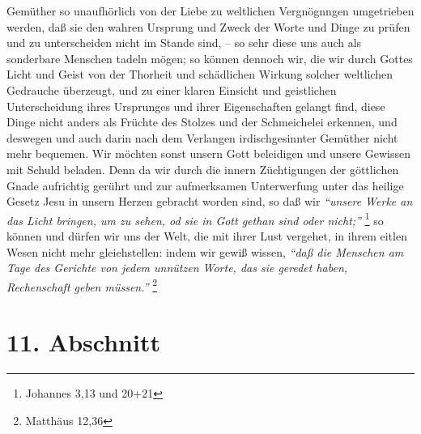 Gemüther so unaufhörlich von der Liebe zu weltlichen Vergnögnngen umgetrieben
werden, daß sie den wahren Ursprung und Zweck der Worte und Dinge zu prüfen und
zu unterscheiden nicht im Stande sind, -- so sehr diese uns auch als sonderbare
Menschen tadeln mögen; so können dennoch wir, die wir durch Gottes Licht und
Geist von der Thorheit und schädlichen Wirkung solcher weltlichen Gedrauche
überzeugt, und zu einer klaren Einsicht und geistlichen Unterscheidung ihres
Ursprunges und ihrer Eigenschaften gelangt find, diese Dinge nicht anders als
Früchte des Stolzes und der Schmeichelei erkennen, und deswegen und auch darin
nach dem Verlangen irdischgesinnter Gemüther nicht mehr bequemen. Wir möchten
sonst unsern Gott beleidigen und unsere Gewissen mit Schuld beladen. Denn da wir
durch die innern Züchtigungen der göttlichen Gnade
aufrichtig gerührt und zur
aufmerksamen Unterwerfung unter das heilige Gesetz Jesu in unsern
Herzen
gebracht worden sind, so daß wir
\textit{"`unsere Werke an das Licht bringen, um zu
sehen, od sie in Gott gethan sind oder nicht;"'}
\footnote{Johannes 3,13 und 20+21}
so können und dürfen wir uns der Welt, die mit ihrer Lust vergehet, in ihrem
eitlen
Wesen nicht mehr gleiehstellen: indem wir gewiß wissen,
\textit{"`daß die Menschen am
Tage des Gerichte von jedem unnützen Worte, das sie geredet haben, Rechenschaft
geben müssen."'}
\footnote{Matthäus 12,36}

\section{11. Abschnitt} \label{kap10_ab11}

